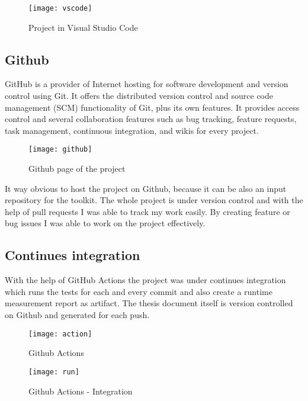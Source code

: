 \begin{figure}[H]
	\centering
	\texttt{[image: vscode]}
	\caption{Project in Visual Studio Code}
	\label{fig:fig-help}
\end{figure}

\newpage
\subsection{Github}

GitHub is a provider of Internet hosting for software development and version control using Git. It offers the distributed version control and source code management (SCM) functionality of Git, plus its own features. It provides access control and several collaboration features such as bug tracking, feature requests, task management, continuous integration, and wikis for every project.\cite{gitbib}

\begin{figure}[H]
	\centering
	\texttt{[image: github]}
	\caption{Github page of the project}
	\label{fig:fig-help}
\end{figure}

It way obvious to host the project on Github, because it can be also an input repository for the toolkit. The whole project is under version control and with the help of pull requests I was able to track my work easily. By creating feature or bug issues I was able to work on the project effectively.

\newpage
\subsection{Continues integration}

With the help of GitHub Actions the project was under continues integration which runs the tests for each and every commit and also create a runtime measurement report as artifact. 
The thesis document itself is version controlled on Github and generated for each push. 

\begin{figure}[H]
	\centering
	\texttt{[image: action]}
	\caption{Github Actions}
	\label{fig:fig-help}
\end{figure}


\begin{figure}[H]
	\centering
	\texttt{[image: run]}
	\caption{Github Actions - Integration}
	\label{fig:fig-help}
\end{figure}



